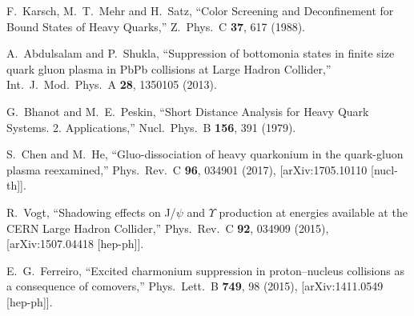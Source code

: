 \documentclass[12pt,a4paper,final]{iopart} %
\begin{document}
\begin{thebibliography}{100}
  F.~Karsch, M.~T.~Mehr and H.~Satz,
  ``Color Screening and Deconfinement for Bound States of Heavy Quarks,''
  Z.\ Phys.\ C {\bf 37}, 617 (1988).

  A.~Abdulsalam and P.~Shukla,
  ``Suppression of bottomonia states in finite size quark gluon plasma in PbPb collisions at Large Hadron Collider,''
  Int.\ J.\ Mod.\ Phys.\ A {\bf 28}, 1350105 (2013).

  
  G.~Bhanot and M.~E.~Peskin,
  ``Short Distance Analysis for Heavy Quark Systems. 2. Applications,''
  Nucl.\ Phys.\ B {\bf 156}, 391 (1979).

  S.~Chen and M.~He,
  ``Gluo-dissociation of heavy quarkonium in the quark-gluon plasma reexamined,''
  Phys.\ Rev.\ C {\bf 96}, 034901 (2017),
  [arXiv:1705.10110 [nucl-th]].

  







  R.~Vogt,
  ``Shadowing effects on J/$\psi$ and $\Upsilon$ production at energies available at the CERN Large Hadron Collider,''
  Phys.\ Rev.\ C {\bf 92}, 034909 (2015), [arXiv:1507.04418 [hep-ph]].


  E.~G.~Ferreiro,
  ``Excited charmonium suppression in proton–nucleus collisions as a consequence of comovers,''
  Phys.\ Lett.\ B {\bf 749}, 98 (2015), [arXiv:1411.0549 [hep-ph]].



\end{thebibliography}
\end{document}
